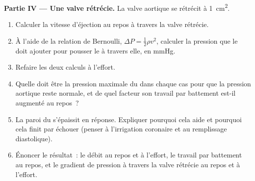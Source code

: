 \begin{problem}
\medskip
\noindent\textbf{Partie IV --- Une valve rétrécie.}
La valve aortique se rétrécit à \qty{1}{cm^2}.
\begin{enumerate}[resume]
  \item Calculer la vitesse d'éjection au repos à travers la valve
        rétrécie.
  \item À l'aide de la relation de Bernoulli, $\Delta P = \tfrac12\rho v^{2}$,
        calculer la pression que le  doit ajouter pour pousser
        le  à travers elle, en mmHg.
  \item Refaire les deux calculs à l'effort.
  \item Quelle doit être la pression maximale du  dans chaque
        cas pour que la pression aortique reste normale, et de quel
        facteur son travail par battement est-il augmenté au repos~?
  \item La paroi du  s'épaissit en réponse. Expliquer pourquoi
        cela aide et pourquoi cela finit par échouer (penser à
        l'irrigation coronaire et au remplissage diastolique).
  \item Énoncer le résultat~: le débit au repos et à l'effort, le travail
        par battement au repos, et le gradient de pression à travers la
        valve rétrécie au repos et à l'effort.
\end{enumerate}
\end{problem}
